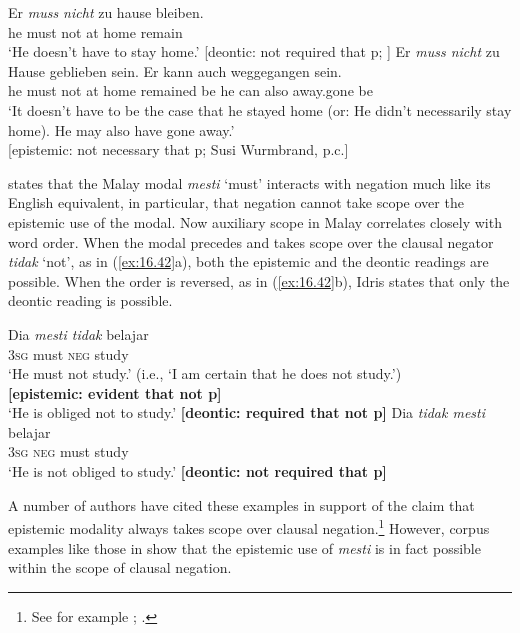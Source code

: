 \ea \label{ex:16.41}
\ea   \gll Er  \textit{muss  nicht}  zu  hause  bleiben.\\
he  must  not  at  home  remain\\
\glt ‘He doesn’t have to stay home.’   [deontic: not required that p; \citet{vonFintel2006}]
\ex \gll Er  \textit{muss  nicht}  zu  Hause  geblieben  sein.  Er  kann  auch  weggegangen  sein.\\
he  must  not  at  home  remained  be  he  can  also  away.gone  be\\
\glt ‘It doesn’t have to be the case that he stayed home (or: He didn’t necessarily stay home). He may also have gone away.’\\
{}[epistemic: not necessary that p; Susi Wurmbrand, p.c.]
\z \z


\citet{Idris1980} states that the Malay modal \textit{mesti} ‘must’ interacts with negation much like its English equivalent, in particular, that negation cannot take scope over the epistemic use of the modal. Now auxiliary scope in Malay correlates closely with word order. When the modal precedes and takes scope over the clausal negator \textit{tidak} ‘not’, as in (\ref{ex:16.42}a), both the epistemic and the deontic readings are possible. When the order is reversed, as in (\ref{ex:16.42}b), Idris states that only the deontic reading is possible.


\ea \label{ex:16.42}
\ea  \gll Dia  \textit{mesti  tidak}  belajar\\
\textsc{3sg}  must  \textsc{neg}  study\\
\glt ‘He must not study.’ (i.e., ‘I am certain that he does not study.’)\\
        \textbf{[epistemic: evident that not p]}\\
‘He is obliged not to study.’  \textbf{[deontic: required that not p]}
\ex \gll Dia  \textit{tidak  mesti}  belajar\\
\textsc{3sg}  \textsc{neg}  must  study\\
\glt ‘He is not obliged to study.’  \textbf{[deontic: not required that p]}
\z \z


A number of authors have cited these examples in support of the claim that epistemic modality always takes scope over clausal negation.\footnote{See for example \citet{deHaan1997}; \citet{Drubig2001}.} However, corpus examples like those in  show that the epistemic use of \textit{mesti} is in fact possible within the scope of clausal negation.


